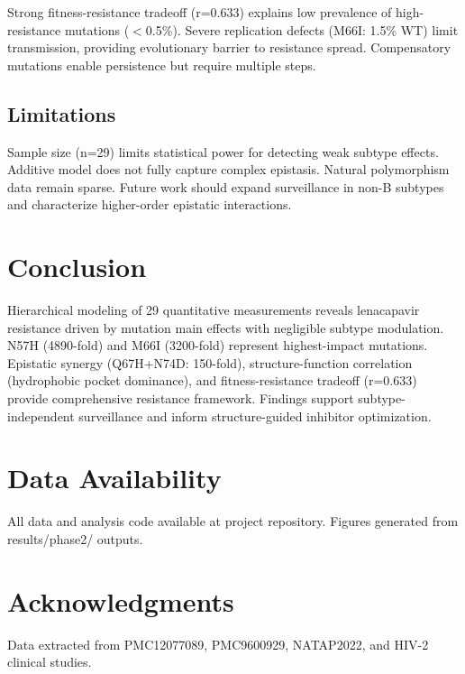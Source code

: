 \documentclass[11pt]{article}
\begin{document}
Strong fitness-resistance tradeoff (r=0.633) explains low prevalence of high-resistance mutations ($<$0.5\%). Severe replication defects (M66I: 1.5\% WT) limit transmission, providing evolutionary barrier to resistance spread. Compensatory mutations enable persistence but require multiple steps.

\subsection{Limitations}

Sample size (n=29) limits statistical power for detecting weak subtype effects. Additive model does not fully capture complex epistasis. Natural polymorphism data remain sparse. Future work should expand surveillance in non-B subtypes and characterize higher-order epistatic interactions.

\section{Conclusion}

Hierarchical modeling of 29 quantitative measurements reveals lenacapavir resistance driven by mutation main effects with negligible subtype modulation. N57H (4890-fold) and M66I (3200-fold) represent highest-impact mutations. Epistatic synergy (Q67H+N74D: 150-fold), structure-function correlation (hydrophobic pocket dominance), and fitness-resistance tradeoff (r=0.633) provide comprehensive resistance framework. Findings support subtype-independent surveillance and inform structure-guided inhibitor optimization.

\section*{Data Availability}
All data and analysis code available at project repository. Figures generated from results/phase2/ outputs.

\section*{Acknowledgments}
Data extracted from PMC12077089, PMC9600929, NATAP2022, and HIV-2 clinical studies.
\end{document}
